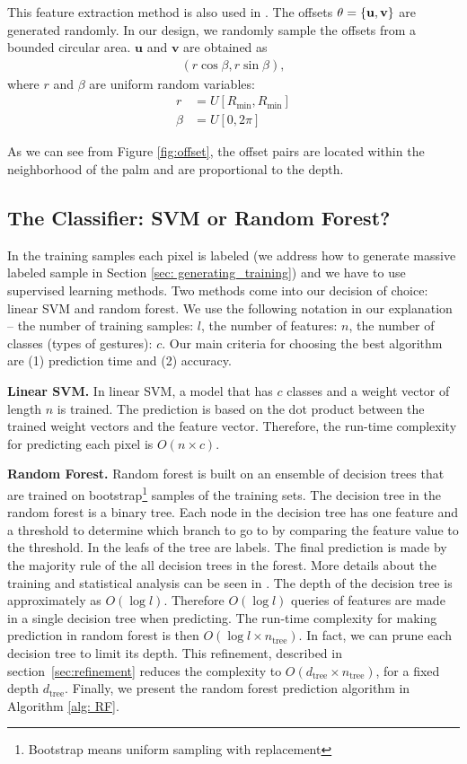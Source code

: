 This feature extraction method is also used in \cite{shotton2011}. The offsets $\theta=\{\bf{u}, \bf{v} \}$ are generated randomly. In our design, we randomly sample the offsets from a bounded circular area. $\textbf{u}$ and $\textbf{v}$ are obtained as
\begin{align}
\label{enq: offest}
 (r \cos \beta, r \sin \beta),
\end{align}
where $r$ and $\beta$ are uniform random variables:
\begin{align}
 r &= U[R_{\text{min}}, R_{\text{min}}]
 \label{eqn: radius} 
 \\
 \beta &= U[0, 2\pi]
\end{align}

As we can see from Figure \ref{fig:offset}, the offset pairs are located within the neighborhood of the palm and are proportional to the depth.

\subsection{The Classifier: SVM or Random Forest?}

In the training samples each pixel is labeled (we address how to generate massive labeled sample in Section \ref{sec: generating_training}) and we have to use supervised learning methods. Two methods come into our decision of choice: linear SVM and random forest. We use the following notation in our explanation -- the number of training samples: $l$, the number of features: $n$, the number of classes (types of gestures): $c$. Our main criteria for choosing the best algorithm are (1) prediction time and (2) accuracy.

\textbf{Linear SVM.} In linear SVM, a model that has $c$ classes and a weight vector of length $n$ is trained. The prediction is based on the dot product between the trained weight vectors and the feature vector. Therefore, the run-time complexity for predicting each pixel is $O(n\times c)$.

\textbf{Random Forest.} Random forest is built on an ensemble of decision trees that are trained on  bootstrap\footnote{Bootstrap means uniform   sampling with replacement} samples of the training sets. The decision tree in the random forest is a binary tree. Each node in the decision tree has one feature and a threshold to determine which branch to go to by comparing the feature value to the threshold. In the leafs of the tree are labels. The final prediction is made by the majority rule of the all decision trees in the forest. More details about the training and statistical analysis can be seen in \cite{lepetit2005}. The depth of the decision tree is approximately as $O(\log l)$. Therefore $O(\log l)$ queries of features are made in a single decision tree when predicting. The run-time complexity for making prediction in random forest is then $O(\log l \times n_{\text{tree}})$. In fact, we can prune each decision tree to limit its depth. This refinement, described in section~\ref{sec:refinement} reduces the complexity to $O(d_{\text{tree}}\times n_{\text{tree}})$, for a fixed depth $d_{\text{tree}}$. Finally, we present the random forest prediction algorithm in Algorithm \ref{alg: RF}.

